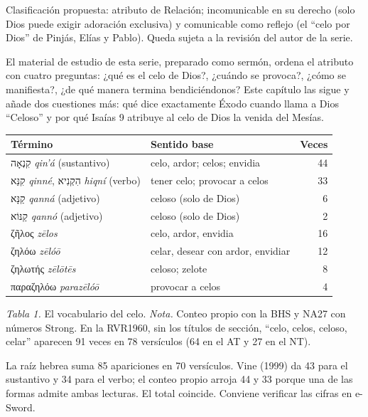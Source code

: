 \documentclass[11pt,letterpaper]{article}
\newcommand{\heb}[1]{\mbox{\foreignlanguage{hebrew}{#1}}}
\newcommand{\grc}[1]{\foreignlanguage{ancientgreek}{#1}}
\begin{document}
\begin{nota}[Precisión]
Clasificación propuesta: atributo de Relación; incomunicable en su derecho (solo Dios puede exigir adoración exclusiva) y comunicable como reflejo (el ``celo por Dios'' de Pinjás, Elías y Pablo). Queda sujeta a la revisión del autor de la serie.
\end{nota}

El material de estudio de esta serie, preparado como sermón, ordena el atributo con cuatro preguntas: ¿qué es el celo de Dios?, ¿cuándo se provoca?, ¿cómo se manifiesta?, ¿de qué manera termina bendiciéndonos? Este capítulo las sigue y añade dos cuestiones más: qué dice exactamente Éxodo cuando llama a Dios ``Celoso'' y por qué Isaías 9 atribuye al celo de Dios la venida del Mesías.

\begin{center}\small\renewcommand{\arraystretch}{1.18}
\begin{tabular}{@{}L{5.2cm}L{5.0cm}r@{}}
\toprule
\textbf{Término} & \textbf{Sentido base} & \textbf{Veces} \\ \midrule
\heb{קִנְאָה} \emph{qin'á} (sustantivo) & celo, ardor; celos; envidia & 44 \\
\heb{קִנֵּא} \emph{qinné}, \heb{הִקְנִיא} \emph{hiqní} (verbo) & tener celo; provocar a celos & 33 \\
\heb{קַנָּא} \emph{qanná} (adjetivo) & celoso (solo de Dios) & 6 \\
\heb{קַנּוֹא} \emph{qannó} (adjetivo) & celoso (solo de Dios) & 2 \\ \midrule
\grc{ζῆλος} \emph{zēlos} & celo, ardor, envidia & 16 \\
\grc{ζηλόω} \emph{zēlóō} & celar, desear con ardor, envidiar & 12 \\
\grc{ζηλωτής} \emph{zēlōtēs} & celoso; zelote & 8 \\
\grc{παραζηλόω} \emph{parazēlóō} & provocar a celos & 4 \\
\bottomrule
\end{tabular}\par
{\footnotesize\color{gris}\textit{Tabla 1.} El vocabulario del celo. \textit{Nota.} Conteo propio con la BHS y NA27 con números Strong. En la RVR1960, sin los títulos de sección, ``celo, celos, celoso, celar'' aparecen 91 veces en 78 versículos (64 en el AT y 27 en el NT).}
\end{center}

\begin{nota}[Precisión]
La raíz hebrea suma 85 apariciones en 70 versículos. Vine (1999) da 43 para el sustantivo y 34 para el verbo; el conteo propio arroja 44 y 33 porque una de las formas admite ambas lecturas. El total coincide. Conviene verificar las cifras en e-Sword.
\end{nota}
\end{document}
